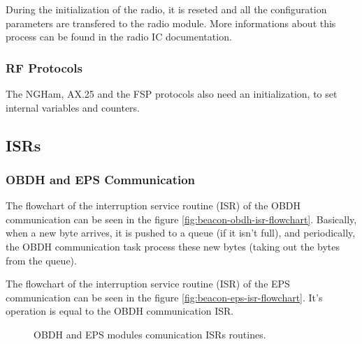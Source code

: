 \documentclass[12pt]{book}
\begin{document}
During the initialization of the radio, it is reseted and all the configuration parameters are transfered to the radio module. More informations about this process can be found in the radio IC documentation.

\subsubsection{RF Protocols}

The NGHam, AX.25 and the FSP protocols also need an initialization, to set internal variables and counters.

\subsection{ISRs}


\subsubsection{OBDH and EPS Communication}

The flowchart of the interruption service routine (ISR) of the OBDH communication can be seen in the figure \ref{fig:beacon-obdh-isr-flowchart}. Basically, when a new byte arrives, it is pushed to a queue (if it isn't full), and periodically, the OBDH communication task process these new bytes (taking out the bytes from the queue).

The flowchart of the interruption service routine (ISR) of the EPS communication can be seen in the figure \ref{fig:beacon-eps-isr-flowchart}. It's operation is equal to the OBDH communication ISR.

\begin{figure}[!h]
	\begin{center}
		\qquad
		\caption{OBDH and EPS modules comunication ISRs routines.}
		\label{fig:obdh-eps-isr-flowchart}
	\end{center}
\end{figure}
\end{document}
